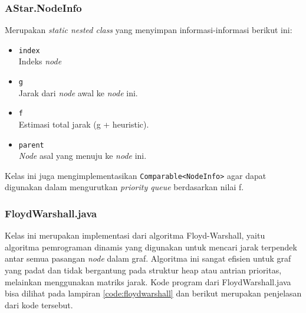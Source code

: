 \subsubsection{AStar.NodeInfo}
Merupakan \textit{static nested class} yang menyimpan informasi-informasi berikut ini:
\begin{itemize}
    \item \texttt{index}
    \\ Indeks \textit{node}
    \item \texttt{g}
    \\ Jarak dari \textit{node} awal ke \textit{node} ini.
    \item \texttt{f}
    \\ Estimasi total jarak (g + heuristic).
    \item \texttt{parent}
    \\ \textit{Node} asal yang menuju ke \textit{node} ini.
\end{itemize}

Kelas ini juga mengimplementasikan \texttt{Comparable<NodeInfo>} agar dapat digunakan dalam mengurutkan \textit{priority queue} berdasarkan nilai f.

\subsubsection{FloydWarshall.java}
Kelas ini merupakan implementasi dari algoritma Floyd-Warshall, yaitu algoritma pemrograman dinamis yang digunakan untuk mencari jarak terpendek antar semua pasangan \textit{node} dalam graf. Algoritma ini sangat efisien untuk graf yang padat dan tidak bergantung pada struktur heap atau antrian prioritas, melainkan menggunakan matriks jarak. Kode program dari FloydWarshall.java bisa dilihat pada lampiran \ref{code:floydwarshall} dan berikut merupakan penjelasan dari kode tersebut.

